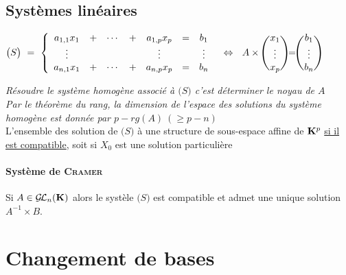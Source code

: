 	\subsection{Systèmes linéaires}
		$ \big( S \big) ~=~ \left\{ \begin{array}{ccccccc}
		a_{1,1}x_1 & + & \cdots & + & a_{1,p} x_p & = & b_1 \\ \vdots & & & & \vdots & & \vdots \\ a_{n,1}x_1 & + & \cdots & + & a_{n,p}x_p &=&b_n
		\end{array} \right. ~~\Leftrightarrow ~~ A \times ~\begin{blockarray}[t]{(c)} x_1 \\ \vdots \\ x_p \end{blockarray} = 
		\begin{blockarray}[t]{(c)} b_1 \\ \vdots \\ b_n \end{blockarray}$
		\newpage \textit{Résoudre le système homogène associé à $\big( S \big)$ c'est déterminer le noyau de $A$\\
		Par le théorème du rang, la dimension de l'espace des solutions du système homogène est donnée par $p-rg(A) ~(\geq p-n )$}
		\vspace*{0.2cm} \\ L'ensemble des solution de $\big( S \big)$ à une structure de sous-espace affine de ${\mathbf{K}}^p$ 
		\underline{si il est compatible}, soit si $X_0$ est une solution particulière \begin{center}
		 \end{center}
		\traitd
		\paragraph{Système de \textsc{Cramer}} Si $A\in\GL_n(\K)$ alors le systèle $\big( S\big)$ est compatible et admet une unique solution 
		$A^{-1} \times B$. \trait
	\section{Changement de bases}
		\traitd
